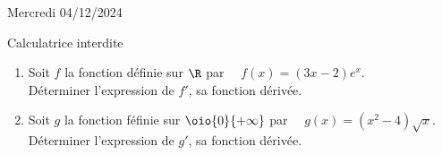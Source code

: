 \documentclass[a4paper,11pt,eval]{nsi}
\begin{document}
\textcolor{UGLiBlue}{Mercredi 04/12/2024}\\
\maketitle
\begin{center}
	Calculatrice interdite
\end{center}


\begin{enumerate}[]
    \item Soit $f$ la fonction définie sur $\R$ par $\quad f(x)=(3x-2)e^x$.\\
    Déterminer l'expression de $f'$, sa fonction dérivée.
    \item Soit $g$ la fonction féfinie sur $\oio{0}{+\infty}$ par $\quad g(x)=(x^2-4)\sqrt{x}$.\\
    Déterminer l'expression de $g'$, sa fonction dérivée.
    
\end{enumerate}
\\
\end{document}

